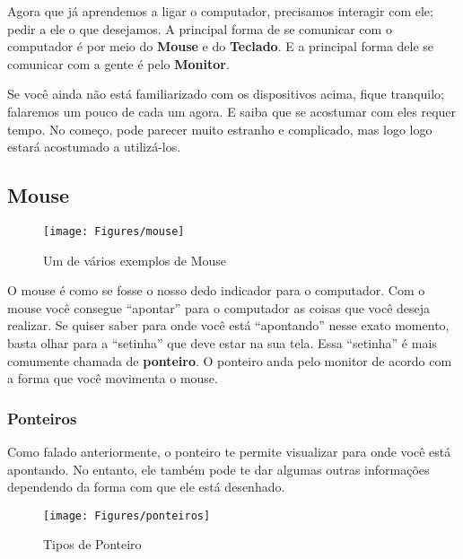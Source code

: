 \documentclass[hidelinks,12pt]{article}
\begin{document}
Agora que já aprendemos a ligar o computador, precisamos interagir com ele; pedir a ele o que desejamos. A principal forma de se comunicar com o computador é por meio do \textbf{Mouse} e do \textbf{Teclado}. E a principal forma dele se comunicar com a gente é pelo \textbf{Monitor}.

Se você ainda não está familiarizado com os dispositivos acima, fique tranquilo; falaremos um pouco de cada um agora. E saiba que se acostumar com eles requer tempo. No começo, pode parecer muito estranho e complicado, mas logo logo estará acostumado a utilizá-los.

\subsection{Mouse}
\label{Mouse}


\begin{figure}[!h]
	\centering
	\texttt{[image: Figures/mouse]}
	\caption{Um de vários exemplos de Mouse}
	\label{fig:mouse}
\end{figure}

O mouse é como se fosse o nosso dedo indicador para o computador. Com o mouse você consegue ``apontar'' para o computador as coisas que você deseja realizar. Se quiser saber para onde você está ``apontando'' nesse exato momento, basta olhar para a ``setinha'' que deve estar na sua tela. Essa ``setinha'' é mais comumente chamada de \textbf{ponteiro}. O ponteiro anda pelo monitor de acordo com a forma que você movimenta o mouse. 

\subsubsection{Ponteiros}

Como falado anteriormente, o ponteiro te permite visualizar para onde você está apontando. No entanto, ele também pode te dar algumas outras informações dependendo da forma com que ele está desenhado.


\begin{figure}[!h]
	\centering
	\texttt{[image: Figures/ponteiros]}
	\caption{Tipos de Ponteiro}
	\label{fig:ponteiros}
\end{figure}
\end{document}
